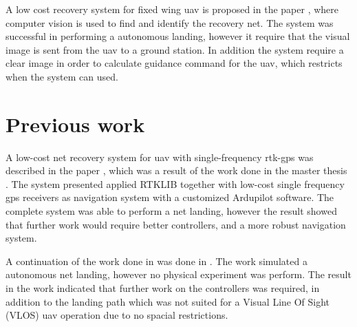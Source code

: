 A low cost recovery system for fixed wing \gls{uav} is proposed in the paper \citep{kim2013fully}, where computer vision is used to find and identify the recovery net. The system was successful in performing a autonomous landing, however it require that the visual image is sent from the \gls{uav} to a ground station. In addition the system require a clear image in order to calculate guidance command for the \gls{uav}, which restricts when the system can used.

\section{Previous work}
A low-cost net recovery system for \gls{uav} with single-frequency \gls{rtk-gps} was described in the paper \citep{skulstad2015net}, which was a result of the work done in the master thesis \citep{Skulstad&Syversen}. The system presented applied RTKLIB together with low-cost single frequency \gls{gps} receivers as navigation system with a customized Ardupilot software. The complete system was able to perform a net landing, however the result showed that further work would require better controllers, and a more robust navigation system.

A continuation of the work done in \citep{Skulstad&Syversen} was done in \citep{Froelich}. The work simulated a autonomous net landing, however no physical experiment was perform. The result in the work indicated that further work on the controllers was required, in addition to the landing path which was not suited for a Visual Line Of Sight  (VLOS) \gls{uav} operation due to no spacial restrictions.

